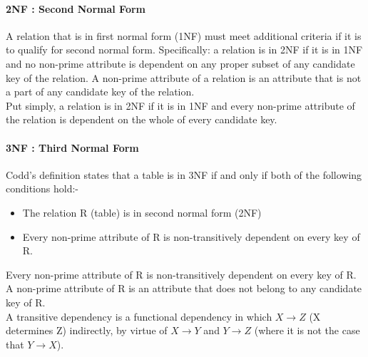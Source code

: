\documentclass[12pt]{report}
\begin{document}
\paragraph*{2NF : Second Normal Form}
A relation that is in first normal form (1NF) must meet additional criteria if it is to qualify for second normal form. Specifically: a relation is in 2NF if it is in 1NF and no non-prime attribute is dependent on any proper subset of any candidate key of the relation. A non-prime attribute of a relation is an attribute that is not a part of any candidate key of the relation. \\
Put simply, a relation is in 2NF if it is in 1NF and every non-prime attribute of the relation is dependent on the whole of every candidate key.

\paragraph*{3NF : Third Normal Form}
Codd's definition states that a table is in 3NF if and only if both of the following conditions hold:-
\begin{itemize}
\item The relation R (table) is in second normal form (2NF)
\item Every non-prime attribute of R is non-transitively dependent on every key of R.
\end{itemize}

Every non-prime attribute of R is non-transitively dependent on every key of R.
A non-prime attribute of R is an attribute that does not belong to any candidate key of R.\\
 A transitive dependency is a functional dependency in which 
 $ X \rightarrow Z $ (X determines Z) indirectly, by virtue of $X \rightarrow Y$ and $Y \rightarrow Z$ (where it is not the case that $Y \rightarrow X$). 
 
\end{document}
